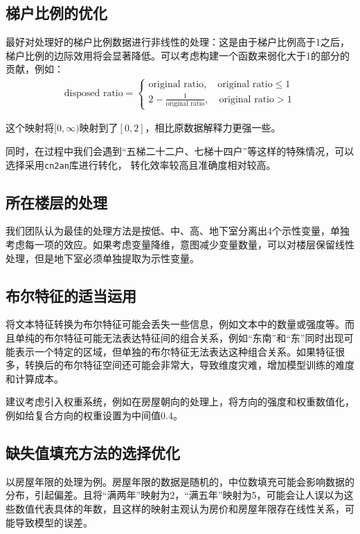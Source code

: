 \documentclass[
    report,     %
    oneside,    %
    UTF8,       %
    zihao=-4    %
]{config} %
\begin{document}
\subsection{梯户比例的优化}

最好对处理好的梯户比例数据进行非线性的处理：这是由于梯户比例高于1之后，梯户比例的边际效用将会显著降低。可以考虑构建一个函数来弱化大于1的部分的贡献，例如：
\begin{align}
    \text{disposed ratio}=\begin{cases}\text{original ratio},\quad\text{original ratio}\leq1\\
        2-\frac{1}{\text{original ratio}} ,\quad\text{original ratio}>1\end{cases}
\end{align}

这个映射将$[0,\infty)$映射到了$[0,2]$，相比原数据解释力更强一些。

同时，在过程中我们会遇到“五梯二十二户、七梯十四户”等这样的特殊情况，可以选择采用\lstinline|cn2an|库进行转化，
转化效率较高且准确度相对较高。

\subsection{所在楼层的处理}

我们团队认为最佳的处理方法是按低、中、高、地下室分离出4个示性变量，单独考虑每一项的效应。如果考虑变量降维，意图减少变量数量，可以对楼层保留线性处理，但是地下室必须单独提取为示性变量。

\subsection{布尔特征的适当运用}

将文本特征转换为布尔特征可能会丢失一些信息，例如文本中的数量或强度等。而且单纯的布尔特征可能无法表达特征间的组合关系，例如“东南”和“东”同时出现可能表示一个特定的区域，但单独的布尔特征无法表达这种组合关系。如果特征很多，转换后的布尔特征空间还可能会非常大，导致维度灾难，增加模型训练的难度和计算成本。

建议考虑引入权重系统，例如在房屋朝向的处理上，将方向的强度和权重数值化，例如给复合方向的权重设置为中间值0.4。


\subsection{缺失值填充方法的选择优化}

以房屋年限的处理为例。房屋年限的数据是随机的，中位数填充可能会影响数据的分布，引起偏差。且将“满两年”映射为2，“满五年”映射为5，可能会让人误以为这些数值代表具体的年数，且这样的映射主观认为房价和房屋年限存在线性关系，可能导致模型的误差。
\end{document}
